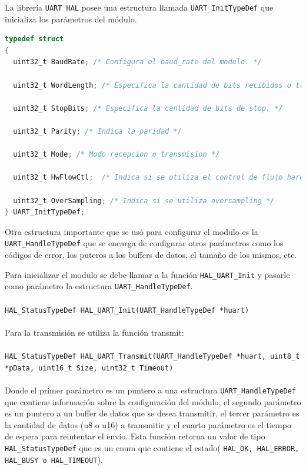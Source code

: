 \documentclass[12pt]{article}
\begin{document}
La librería \texttt{UART HAL} posee una estructura llamada \texttt{UART\_InitTypeDef} que inicializa los parámetros del módulo.

\begin{lstlisting}[language=C]
  typedef struct
{
  uint32_t BaudRate; /* Configura el baud_rate del modulo. */

  uint32_t WordLength; /* Especifica la cantidad de bits recibidos o transmitidos en un frame. */

  uint32_t StopBits; /* Especifica la cantidad de bits de stop. */

  uint32_t Parity; /* Indica la paridad */

  uint32_t Mode; /* Modo recepcion o transmision */

  uint32_t HwFlowCtl;  /* Indica si se utiliza el control de flujo hardware */

  uint32_t OverSampling; /* Indica si se utiliza oversampling */
} UART_InitTypeDef;

\end{lstlisting}

Otra estructura importante que se usó para configurar el modulo es la \texttt{UART\_HandleTypeDef} que se encarga de configurar otros parámetros como los códigos de error, los puteros a los buffers de datos, el tamaño de los mismos, etc.


Para inicializar el modulo se debe llamar a la función \texttt{HAL\_UART\_Init} y pasarle como parámetro la estructura \texttt{UART\_HandleTypeDef}. 
\\\\
\lstinline|HAL_StatusTypeDef HAL_UART_Init(UART_HandleTypeDef *huart)|
\\\\
Para la transmisión se utiliza la función transmit:
\\\\
\lstinline|HAL_StatusTypeDef HAL_UART_Transmit(UART_HandleTypeDef *huart, uint8_t *pData, uint16_t Size, uint32_t Timeout)|
\\\\
Donde el primer parámetro es un puntero a una estructura \texttt{UART\_HandleTypeDef} que contiene información sobre la configuración del módulo, el segundo parámetro es un puntero a un buffer de datos que se desea transmitir, el tercer parámetro es la cantidad de datos (u8 o u16) a transmitir y el cuarto parámetro es el tiempo de espera para reintentar el envio. Esta función retorna un valor de tipo \texttt{HAL\_StatusTypeDef} que es un enum que contiene el estado( \texttt{HAL\_OK, HAL\_ERROR, HAL\_BUSY o HAL\_TIMEOUT}).
\end{document}
